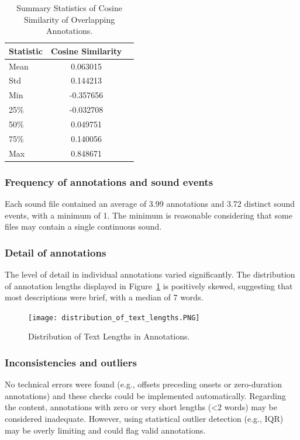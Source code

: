 \documentclass{article}
\begin{document}
\begin{table}[h]
    \caption{Summary Statistics of Cosine Similarity of Overlapping Annotations.}
    \label{tab:cos}
    \centering
    \begin{tabular}{lcl}
        \toprule
        Statistic & Cosine Similarity \\ \midrule
        Mean            & 0.063015 \\
        Std             & 0.144213 \\
        Min             & -0.357656 \\
        25\%            & -0.032708 \\
        50\%            & 0.049751 \\
        75\%            & 0.140056 \\ 
        Max             & 0.848671 \\ \bottomrule
    \end{tabular}
\end{table}

\subsubsection{Frequency of annotations and sound events}
Each sound file contained an average of 3.99 annotations and 3.72 distinct sound events, with a minimum of 1. The minimum is reasonable considering that some files may contain a single continuous sound.

\subsubsection{Detail of annotations}
The level of detail in individual annotations varied significantly. The distribution of annotation lengths displayed in Figure~\ref{fig:len} is positively skewed, suggesting that most descriptions were brief, with a median of 7 words.

\begin{figure}[h]
    \centering
    \texttt{[image: distribution\_of\_text\_lengths.PNG]}
    \caption{Distribution of Text Lengths in Annotations.}
    \label{fig:len}
\end{figure}

\subsubsection{Inconsistencies and outliers}
No technical errors were found (e.g., offsets preceding onsets or zero-duration annotations) and these checks could be implemented automatically.
Regarding the content, annotations with zero or very short lengths (<2 words) may be considered inadequate. However, using statistical outlier detection (e.g., IQR) may be overly limiting and could flag valid annotations.
\end{document}
